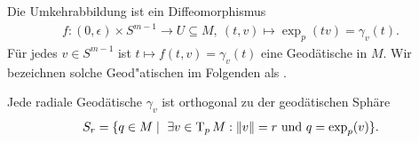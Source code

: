 Die Umkehrabbildung ist ein Diffeomorphismus
\begin{align*}
  f \colon (0, \epsilon) \times S^{m-1} \to U \subseteq M, \ 
  (t,v) \mapsto \exp_p(tv) = \gamma_v(t).
\end{align*}
Für jedes $v \in S^{m-1}$ ist $t \mapsto f(t,v) = \gamma_v(t)$ eine Geodätische in $M$. Wir bezeichnen solche Geod"atischen im Folgenden als .

\begin{Lemma}
  Jede radiale Geodätische $\gamma_v$ ist orthogonal zu der geodätischen Sphäre
  \begin{align*}
    S_r = \{q \in M \mid \ \exists v \in \operatorname{T}_pM: \|v\| = r \text{ und } q = \exp_p(v) \}.
  \end{align*}
\end{Lemma}

